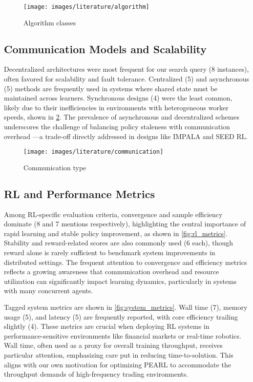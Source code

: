 \begin{figure}
    \centering
    \texttt{[image: images/literature/algorithm]}
    \caption{Algorithm classes}
    \label{fig:algorithm}
\end{figure}

\subsection{Communication Models and Scalability}

Decentralized architectures were most frequent for our search query (8 instances), often favored for scalability and fault tolerance.
Centralized (5) and asynchronous (5) methods are frequently used in systems where shared state must be maintained across learners.
Synchronous designs (4) were the least common, likely due to their inefficiencies in environments with heterogeneous worker speeds,
shown in \cref{fig:communication_type}.
The prevalence of asynchronous and decentralized schemes underscores the challenge of balancing policy staleness with communication overhead
—a trade-off directly addressed in designs like IMPALA and SEED RL.

\begin{figure}
    \centering
    \texttt{[image: images/literature/communication]}
    \caption{Communication type}
    \label{fig:communication_type}
\end{figure}

\subsection{RL and Performance Metrics}

Among RL-specific evaluation criteria, convergence and sample efficiency dominate (8 and 7 mentions respectively),
highlighting the central importance of rapid learning and stable policy improvement, as shown in \cref{fig:rl_metrics}.
Stability and reward-related scores are also commonly used (6 each), though reward alone is rarely sufficient to benchmark system improvements in distributed settings.
The frequent attention to convergence and efficiency metrics reflects a growing awareness that communication overhead and resource utilization can significantly
impact learning dynamics, particularly in systems with many concurrent agents.

Tagged system metrics are shown in \cref{fig:system_metrics}.
Wall time (7), memory usage (5), and latency (5) are frequently reported, with core efficiency trailing slightly (4).
These metrics are crucial when deploying RL systems in performance-sensitive environments like financial markets or real-time robotics.
Wall time, often used as a proxy for overall training throughput, receives particular attention,
emphasizing care put in reducing time-to-solution.
This aligns with our own motivation for optimizing PEARL to accommodate the throughput demands of high-frequency trading environments.

